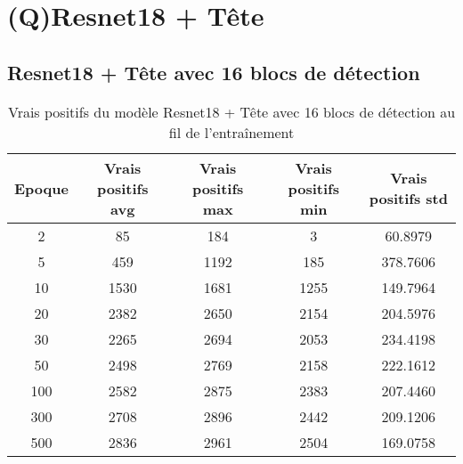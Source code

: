 \clearpage


\section{(Q)Resnet18 + Tête}


\subsection{Resnet18 + Tête avec 16 blocs de détection}

\begin{table}[!ht]
    \caption{Vrais positifs du modèle Resnet18 + Tête avec 16 blocs de détection au fil de l'entraînement}
    \label{tab:resnet18+head_16n_true_positive}
    \centering
    \begin{tabular}{ |c||c|c|c|c|  }
        \hline
        \rowcolor{gray!50}
        Epoque & Vrais positifs avg & Vrais positifs max & Vrais positifs min & Vrais positifs std\\
        \hline
        2 & 85 & 184 & 3 & 60.8979\\
        5 & 459 & 1192 & 185 & 378.7606\\
        10 & 1530 & 1681 & 1255 & 149.7964\\
        20 & 2382 & 2650 & 2154 & 204.5976\\
        30 & 2265 & 2694 & 2053 & 234.4198\\
        50 & 2498 & 2769 & 2158 & 222.1612\\
        100 & 2582 & 2875 & 2383 & 207.4460\\
        300 & 2708 & 2896 & 2442 & 209.1206\\
        500 & 2836 & 2961 & 2504 & 169.0758\\
        \hline
    \end{tabular}
\end{table}

